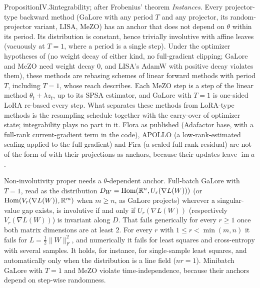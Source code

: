 \begin{restate}{Proposition}{IV.3}{integrability; after Frobenius' theorem}
\emph{Instances.} Every projector-type backward method (GaLore with any period $T$ and any projector, its
random-projector variant, LISA, MeZO) has an anchor that does not depend on $\theta$ within its period. Its distribution
is constant, hence trivially involutive with affine leaves (vacuously at $T=1$, where a period is a single step). Under
the optimizer hypotheses of  (no weight decay of either kind, no full-gradient clipping; GaLore
and MeZO need weight decay $0$, and LISA's AdamW with positive decay violates them), these methods are rebasing schemes
of linear forward methods with period $T$, including $T=1$, whose reach  describes. Each MeZO step is a step of the linear method
$\theta_t+\lambda z_t$, up to its SPSA estimator, and GaLore with $T=1$ is one-sided LoRA re-based every step. What
separates these methods from LoRA-type methods is the resampling schedule together with the carry-over of optimizer
state; integrability plays no part in it. Flora as published (Adafactor base, with a full-rank current-gradient term in
the code), APOLLO (a low-rank-estimated scaling applied to the full gradient) and Fira (a scaled full-rank residual) are
not of the form of  with their projections as anchors, because their updates leave
$\operatorname{im}a$.

Non-involutivity proper needs a $\theta$-dependent anchor. Full-batch GaLore with $T=1$, read as the distribution
$D_W=\operatorname{Hom}(\mathbb{R}^n,U_r(\nabla L(W)))$ (or $\operatorname{Hom}(V_r(\nabla L(W)),\mathbb{R}^m)$ when $m\ge n$, as GaLore
projects) wherever a singular-value gap exists, is involutive if and only if $U_r(\nabla L(W))$ (respectively
$V_r(\nabla L(W))$) is invariant along $D$. That fails generically for every $r\ge1$ once both matrix dimensions are at
least $2$. For every $r$ with $1\le r<\min(m,n)$ it fails for $L=\tfrac12\lVert W\rVert_F^2$, and numerically it fails
for least squares and cross-entropy with several samples. It holds, for instance, for single-sample least squares, and
automatically only when the distribution is a line field ($nr=1$). Minibatch GaLore with $T=1$ and MeZO violate
time-independence, because their anchors depend on step-wise randomness.
\end{restate}

